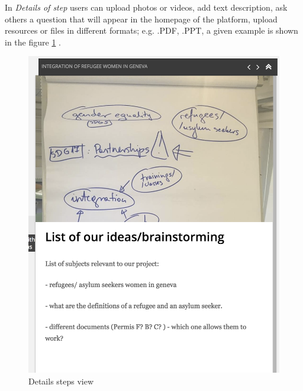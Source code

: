 In \textit{Details of step} users can upload photos or videos, add text description, ask others a question that will appear in the homepage of the platform, upload resources or files in different formats; e.g. .PDF, .PPT, a given example is shown in the figure \ref{img-stepdetails1} .
\begin{figure}[H]
	\centering
	\includegraphics[scale=.3]{./images/img-stepdetails1.png}
	\caption{Details steps view} 
	\label{img-stepdetails1}
\end{figure}

